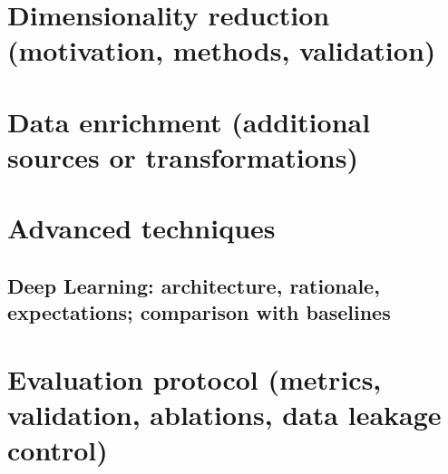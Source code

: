 \section{Dimensionality reduction (motivation, methods, validation)}\label{sec:dim-reduction}

\section{Data enrichment (additional sources or transformations)}\label{sec:data-enrichment}

\section{Advanced techniques}\label{sec:advanced-techniques}
\subsection{Deep Learning: architecture, rationale, expectations; comparison with baselines}\label{subsec:deep-learning}

\section{Evaluation protocol (metrics, validation, ablations, data leakage control)}\label{sec:evaluation-protocol}

